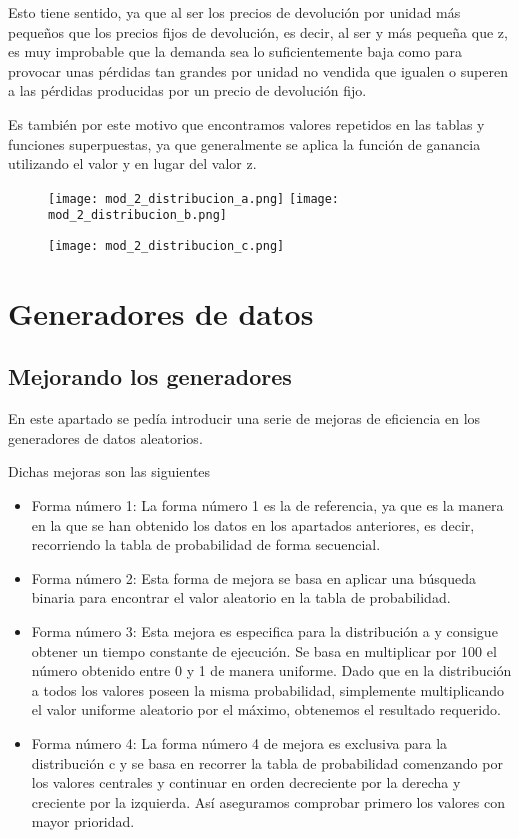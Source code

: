 Esto tiene sentido, ya que al ser los precios de devolución por unidad más pequeños que los precios fijos de devolución, es decir, al ser y más pequeña que z, es muy improbable que la demanda sea lo suficientemente baja como para provocar unas pérdidas tan grandes por unidad no vendida que igualen o superen a las pérdidas producidas por un precio de devolución fijo.

Es también por este motivo que encontramos valores repetidos en las tablas y funciones superpuestas, ya que generalmente se aplica la función de ganancia utilizando el valor y en lugar del valor z.

\begin{figure}[H]
	\centering
	\texttt{[image: mod\_2\_distribucion\_a.png]}
	\texttt{[image: mod\_2\_distribucion\_b.png]}
\end{figure}
\begin{figure}[H]
	\centering
	\texttt{[image: mod\_2\_distribucion\_c.png]}
\end{figure}

\chapter{Generadores de datos}

\section{Mejorando los generadores}

En este apartado se pedía introducir una serie de mejoras de eficiencia en los generadores de datos aleatorios.

Dichas mejoras son las siguientes

\begin{itemize}
	\item Forma número 1: La forma número 1 es la de referencia, ya que es la manera en la que se han obtenido los datos en los apartados anteriores, es decir, recorriendo la tabla de probabilidad de forma secuencial.
	\item Forma número 2: Esta forma de mejora se basa en aplicar una búsqueda binaria para encontrar el valor aleatorio en la tabla de probabilidad.
	\item Forma número 3: Esta mejora es especifica para la distribución a y consigue obtener un tiempo constante de ejecución. Se basa en multiplicar por 100 el número obtenido entre 0 y 1 de manera uniforme. Dado que en la distribución a todos los valores poseen la misma probabilidad, simplemente multiplicando el valor uniforme aleatorio por el máximo, obtenemos el resultado requerido.
	\item Forma número 4: La forma número 4 de mejora es exclusiva para la distribución c y se basa en recorrer la tabla de probabilidad comenzando por los valores centrales y continuar en orden decreciente por la derecha y creciente por la izquierda. Así aseguramos comprobar primero los valores con mayor prioridad.
\end{itemize}

